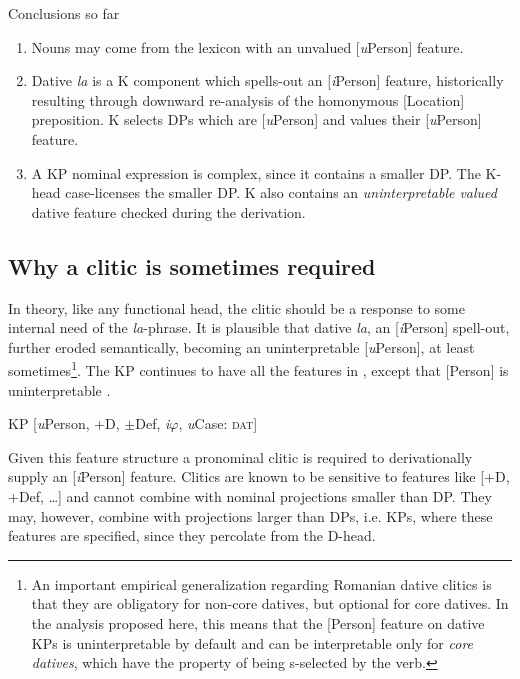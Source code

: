 \documentclass[output=paper,colorlinks,citecolor=brown,nonflat]{langsci/langscibook}
\begin{document}
 {Conclusions} {so} {far}
 \begin{enumerate}
	\item Nouns may come from the lexicon with an unvalued [\textit{u}Person] feature.
	\item Dative \textit{la} is a K component which spells-out an [\textit{i}Person] feature, historically resulting through downward re-analysis of the homonymous [Location] preposition. K selects DPs which are [\textit{u}Person] and values their [\textit{u}Person] feature.
	\item A KP nominal expression is complex, since it contains a smaller DP. The K-head case-licenses the smaller DP. K also contains an \textit{uninterpretable valued} dative feature checked during the derivation.
	\end{enumerate}

\subsection{Why a clitic is sometimes required}

In theory, like any functional head, the clitic should be a response to some internal need of the \textit{la}-phrase. It is plausible that dative \textit{la}, an [\textit{i}Person] spell-out, further eroded semantically, becoming an uninterpretable [\textit{u}Person], at least sometimes\footnote{An important empirical generalization \citep{Cornilescu2017} regarding Romanian dative clitics is that they are obligatory for non-core datives, but optional for core datives. In the analysis proposed here, this means that the [Person] feature on dative KPs is uninterpretable by default and can be interpretable only for \textit{core datives}, which have the property of being s-selected by the verb.}. The KP continues to have all the features in , except that [Person] is uninterpretable .

\ea%
      \label{ex:cornilescu:17}
      KP [\textit{u}Person, +D, ${\pm}$Def, \textit{i}${\varphi}$, \textit{u}Case: \textsc{dat}]
      \z

Given this feature structure a pronominal clitic is required to derivationally supply an [\textit{i}Person] feature. Clitics are known to be sensitive to features like [+D, +Def, …] and cannot combine with nominal projections smaller than DP. They may, however, combine with projections larger than DPs, i.e. KPs, where these features are specified, since they percolate from the D-head.
\end{document}
